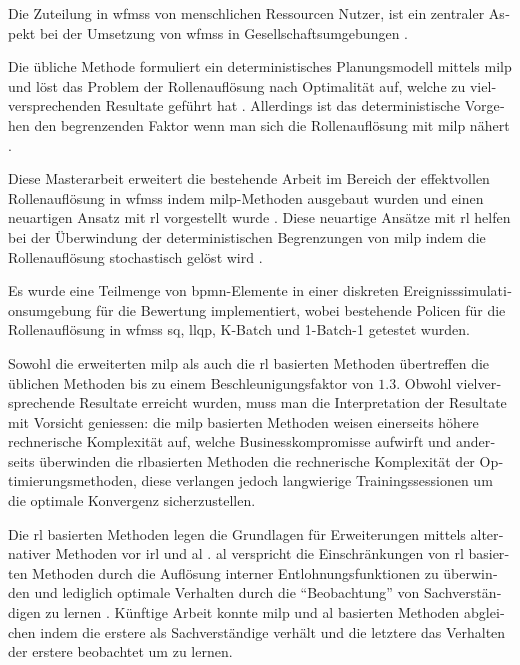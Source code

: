 \begin{otherlanguage}{ngerman}
	\begin{zusammenfassung}
	Die Zuteilung in \glspl{wfms} von menschlichen Ressourcen \dhg Nutzer, ist ein zentraler Aspekt bei der Umsetzung von \glspl{wfms} in Gesellschaftsumgebungen \citep{Cheng2000,Mentzas2001}.

	Die übliche Methode formuliert ein deterministisches Planungsmodell mittels \gls{milp} und löst das Problem der Rollenauflösung nach Optimalität auf, welche zu vielversprechenden Resultate geführt hat \citep{Zeng2005}. Allerdings ist das deterministische Vorgehen den begrenzenden Faktor wenn man sich die Rollenauflösung mit \gls{milp} nähert \citep{Zeng2005}.

	Diese Masterarbeit erweitert die bestehende Arbeit im Bereich der effektvollen Rollenauflösung in \glspl{wfms} indem \gls{milp}-Methoden ausgebaut wurden und einen neuartigen Ansatz mit \gls{rl} vorgestellt wurde \citep{Sutton2017}. Diese neuartige Ansätze mit \gls{rl} helfen bei der Überwindung der deterministischen Begrenzungen von \gls{milp} indem die Rollenauflösung stochastisch gelöst wird \citep{Sutton2017}.

	Es wurde eine Teilmenge von \gls{bpmn}-Elemente in einer diskreten Ereignisssimulationsumgebung für die Bewertung implementiert, wobei bestehende Policen für die Rollenauflösung in \glspl{wfms} \zbg \gls{sq}, \gls{llqp}, K-Batch und 1-Batch-1 getestet wurden.

	Sowohl die erweiterten \gls{milp} als auch die \gls{rl} basierten Methoden übertreffen die üblichen Methoden bis zu einem Beschleunigungsfaktor von $1.3$. Obwohl vielversprechende Resultate erreicht wurden, muss man die Interpretation der Resultate mit Vorsicht geniessen: die \gls{milp} basierten Methoden weisen einerseits höhere rechnerische Komplexität auf, welche Businesskompromisse aufwirft und anderseits überwinden die \gls{rl}basierten Methoden die rechnerische Komplexität der Optimierungsmethoden, diese verlangen jedoch langwierige Trainingssessionen um die optimale Konvergenz sicherzustellen.

	Die \gls{rl} basierten Methoden legen die Grundlagen für Erweiterungen mittels alternativer Methoden vor \zbg \gls{irl} \citep{Ng2000} und \gls{al} \citep{Abbeel2004}. \gls{al} verspricht die Einschränkungen von \gls{rl} basierten Methoden durch die Auflösung interner Entlohnungsfunktionen zu überwinden und lediglich optimale Verhalten durch die ``Beobachtung'' von Sachverständigen zu lernen \citep{Abbeel2004}. Künftige Arbeit konnte \gls{milp} und \gls{al} basierten Methoden abgleichen indem die erstere als Sachverständige verhält und die letztere das Verhalten der erstere beobachtet um zu lernen.
	\end{zusammenfassung}
\end{otherlanguage}
